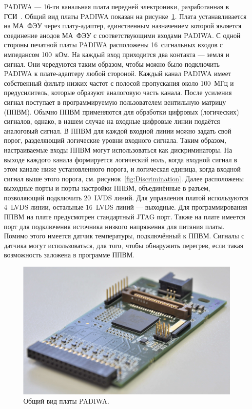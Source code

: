 PADIWA --- 16-ти канальная плата передней электроники, разработанная в ГСИ~\cite{}. Общий вид платы PADIWA показан на рисунке~\ref{fig:PADIWA}. Плата устанавливается на МА~ФЭУ через плату-адаптер, единственным назначением которой является соединение анодов МА~ФЭУ с соответствующими входами PADIWA. С одной стороны печатной платы PADIWA расположены 16~сигнальных входов с импедансом 100~кОм. На каждый вход приходится два контакта --- земля и сигнал. Они чередуются таким образом, чтобы можно было подключить PADIWA к плате-адаптеру любой стороной. Каждый канал PADIWA имеет собственный фильтр низких частот с полосой пропускания около 100~МГц и предусилитель, которые образуют аналоговую часть канала. После усиления сигнал поступает в программируемую пользователем вентильную матрицу (ППВМ). Обычно ППВМ применяются для обработки цифровых (логических) сигналов, однако, в нашем случае на входные цифровые линии подаётся аналоговый сигнал. В ППВМ для каждой входной линии можно задать свой порог, разделяющий логические уровни входного сигнала. Таким образом, настраиваемые входы ППВМ могут использоваться как дискриминаторы. На выходе каждого канала формируется логический ноль, когда входной сигнал в этом канале ниже установленного порога, и логическая единица, когда входной сигнал выше этого порога, см. рисунок~\ref{fig:Discrimination}. Далее расположены выходные порты и порты настройки ППВМ, объединённые в разъем, позволяющий подключить 20~LVDS линий. Для управления платой используются 4~LVDS линии, остальные 16~LVDS линий --- выходные. Для программирования ППВМ на плате предусмотрен стандартный JTAG порт. Также на плате имеется порт для подключения источника низкого напряжения для питания платы. Помимо этого имеется датчик температуры, подключённый к ППВМ. Сигналы с датчика могут использоваться, для того, чтобы обнаружить перегрев, если такая возможность заложена в программе ППВМ.

\begin{figure}
\includegraphics[width=1.0\textwidth]{pictures/5_padiwa_lowres.jpg}
\caption{Общий вид платы PADIWA.}
\label{fig:PADIWA}
\end{figure}

